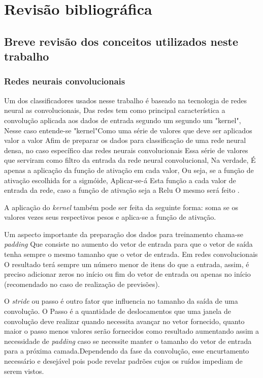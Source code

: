 \chapter{Revisão bibliográfica} \label{chap:revBibli}
	\section{Breve revisão dos conceitos utilizados neste trabalho}

		\subsection{Redes neurais convolucionais}
			\par Um dos classificadores usados nesse trabalho é baseado na tecnologia de redes neural as convolucionais, Das redes tem como principal característica a convolução aplicada aos dados de entrada segundo um segundo um "kernel", Nesse caso entende-se "kernel"Como uma série de valores que deve ser aplicados valor a valor Afim de preparar os dados para classificação de uma rede neural densa, no caso específico das redes neurais convolucionais Essa série de valores que serviram como filtro da entrada da rede neural convolucional, Na verdade, É apenas a aplicação da função de ativação em cada valor, Ou seja, se a função de ativação escolhida for a sigmóide, Aplicar-se-á Esta função a cada valor de entrada da rede, caso a função de ativação seja a Relu O mesmo será feito \cite{UYCNWV}.
			
			\par A aplicação do \textit{kernel} também pode ser feita da seguinte forma: soma se os valores vezes seus respectivos pesos e aplica-se a função de ativação.
			
			\par Um aspecto importante da preparação dos dados para treinamento chama-se \textit{padding} Que consiste no aumento do vetor de entrada para que o vetor de saída tenha sempre o mesmo tamanho que o vetor de entrada.
			Em redes convolucionais O resultado terá sempre um número menor de itens do que a entrada, assim, é preciso adicionar zeros no início ou fim do vetor de entrada ou apenas no início (recomendado no caso de realização de previsões).

			\par O \textit{stride} ou passo é outro fator que influencia no tamanho da saída de uma convolução. O Passo é a quantidade de deslocamentos que uma janela de convolução deve realizar quando necessita avançar no vetor fornecido, quanto maior o passo menos valores serão fornecidos como resultado aumentando assim a necessidade de \textit{padding} caso se necessite manter o tamanho do vetor de entrada para a próxima camada.Dependendo da fase da convolução, esse encurtamento necessário e desejável pois pode revelar padrões cujos os ruídos impediam de serem vistos.
			
